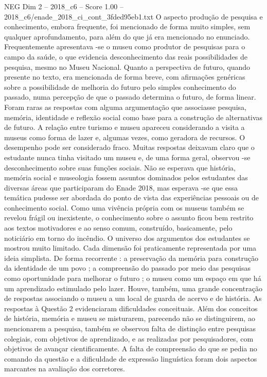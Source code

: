 \begin{textsample}{NEG Dim 2 – 2018\_c6 – Score 1.00 – 2018\_c6/enade\_2018\_ci\_cont\_3fded95eb1.txt}
O aspecto produção de pesquisa e conhecimento, embora frequente, foi mencionado de forma muito simples, sem qualquer aprofundamento, para além do que já era mencionado no enunciado.
Frequentemente apresentava -se o museu como produtor de pesquisas para o campo da saúde, o que evidencia desconhecimento das reais possibilidades de pesquisa, mesmo no Museu Nacional.
Quanto a perspectiva de futuro, quando presente no texto, era mencionada de forma breve, com afirmações genéricas sobre a possibilidade de melhoria do futuro pelo simples conhecimento do passado, numa percepção de que o passado determina o futuro, de forma linear.
Foram raras as respostas com alguma argumentação que associasse pesquisa, memória, identidade e reflexão social como base para a construção de alternativas de futuro.
A relação entre turismo e museu apareceu considerando a visita a museus como forma de lazer e, algumas vezes, como geradora de recursos.
O desempenho pode ser considerado fraco.
Muitas respostas deixavam claro que o estudante nunca tinha visitado um museu e, de uma forma geral, observou -se desconhecimento sobre suas funções sociais.
Não se esperava que história, memória social e museologia fossem assuntos dominados pelos estudantes das diversas áreas que participaram do Enade 2018, mas esperava -se que essa temática pudesse ser abordada do ponto de vista das experiências pessoais ou de conhecimento social.
Como uma vivência própria com os museus também se revelou frágil ou inexistente, o conhecimento sobre o assunto ficou bem restrito aos textos motivadores e ao senso comum, construído, basicamente, pelo noticiário em torno do incêndio.
O universo dos argumentos dos estudantes se mostrou muito limitado.
Cada dimensão foi praticamente representada por uma ideia simplista.
De forma recorrente : a preservação da memória para construção da identidade de um povo ; a compreensão do passado por meio das pesquisas como oportunidade para melhorar o futuro ; o museu como um espaço em que há um aprendizado estimulado pelo lazer.
Houve, também, uma grande concentração de respostas associando o museu a um local de guarda de acervo e de história.
As respostas à Questão 2 evidenciaram dificuldades conceituais.
Além dos conceitos de história, memória e museu se misturarem, parecendo não se distinguirem, ao mencionarem a pesquisa, também se observou falta de distinção entre pesquisas colegiais, com objetivos de aprendizado, e as realizadas por pesquisadores, com objetivos de avançar cientificamente.
A falta de compreensão do que se pedia no comando da questão e a dificuldade de expressão linguística foram dois aspectos marcantes na avaliação dos corretores.

\end{textsample}
